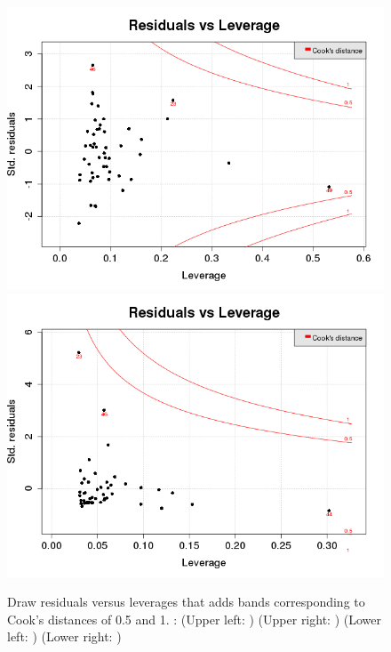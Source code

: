 \begin{figure}[p]
\begin{center}
    \includegraphics[scale=0.4]{imgOT/model1-drawResidualsVsLeverages.png}\hspace*{1cm}
	\includegraphics[scale=0.4]{imgOT/model2-drawResidualsVsLeverages.png}\\
  \end{center}
  \caption{Draw residuals versus leverages that adds bands corresponding to Cook's distances of 0.5 and 1. :\newline
  (Upper left: \textbf{\color{black}{model1: R output}}) (Upper right: \textbf{\color{black}{model2: R output}}) \newline
  (Lower left: \textbf{\color{blue}{model1: python output}})  (Lower right: \textbf{\color{blue}{model2: python output}}) }
\end{figure}

